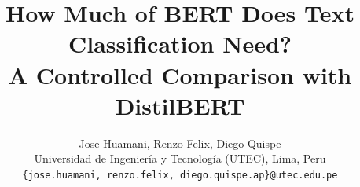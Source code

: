 \documentclass{article}
\title{How Much of BERT Does Text Classification Need?\\
A Controlled Comparison with DistilBERT}
\author{%
  Jose Huamani, Renzo Felix, Diego Quispe \\
  Universidad de Ingenier\'ia y Tecnolog\'ia (UTEC), Lima, Peru \\
  \texttt{\{jose.huamani, renzo.felix, diego.quispe.ap\}@utec.edu.pe}
}
\begin{document}
\maketitle








{\small


}
\end{document}
